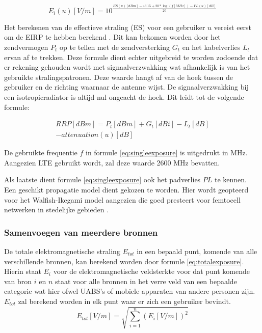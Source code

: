 \documentclass[twocolumn]{phdsymp_dutch}
\begin{document}
\begin{equation}
E_i(u) [V/m] = 10^{\frac{ES(u)[dBm] - 43.15 + 20*\log(f [MHz])- PL(u) [dB]}{20}}
\label{eq:singleexposure}
\end{equation}

Het berekenen van de effectieve straling (ES) voor een gebruiker $u$ vereist eerst om de  \gls{EIRP} te hebben berekend 
 \cite{J6_originalExposureFormula,J1}. Dit kan bekomen worden door het zendvermogen $P_t$ op te tellen met de zendversterking $G_t$
 en het kabelverlies $L_t$ ervan af te trekken.
 Deze formule dient echter uitgebreid te worden zodoende dat er rekening gehouden wordt met signaalverzwakking wat afhankelijk is van 
 het gebruikte stralingspatronen. Deze waarde hangt af van de hoek tussen de gebruiker en de richting waarnaar de antenne wijst. 
 De signaalverzwakking bij een \gls{isotropicradiator} is altijd nul ongeacht de hoek.
 Dit leidt tot de volgende formule:

\begin{equation}
\begin{aligned}
RRP [dBm] = P_t [dBm] + G_t [dBi]- L_t [dB]\\
     - attenuation(u) [dB]
\end{aligned}
\label{eq:eirp}
\end{equation}

De gebruikte frequentie $f$ in formule \ref{eq:singleexposure} is uitgedrukt in MHz. Aangezien 
\gls{LTE} gebruikt wordt, zal deze waarde 2600 MHz bevatten.

Als laatste dient formule \ref{eq:singleexposure} ook het padverlies $PL$ te kennen.
Een geschikt propagatie model dient gekozen te worden. Hier wordt geopteerd voor het 
Walfish-Ikegami model aangezien die goed presteert voor femtocell netwerken in stedelijke gebieden \cite{J2}.

\subsubsection{Samenvoegen van meerdere bronnen}

De totale elektromagnetische straling $E_{tot}$ in een bepaald punt, komende van alle verschillende bronnen, kan berekend worden 
door formule \ref{eq:totalexposure}. Hierin staat $E_i$ voor de elektromagnetische veldsterkte voor dat punt komende van bron $i$
en $n$ staat voor alle bronnen in het verre veld van een bepaalde categorie wat hier ofwel \gls{UABS}'s of mobiele apparaten van andere personen zijn.
$E_{tot}$ zal berekend worden in elk punt waar er zich een gebruiker bevindt.
\begin{equation}
E_{tot} [V/m] = \sqrt{\sum_{i=1}^{n} (E_i [V/m]) ^2}
\label{eq:totalexposure}
\end{equation}
\end{document}
